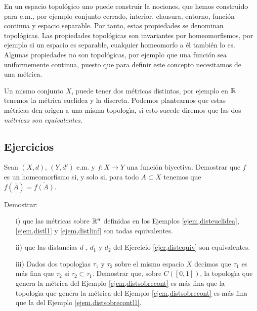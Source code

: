 En un espacio topológico uno puede construir la nociones, que
hemos construido para e.m., por ejemplo conjunto cerrado,
interior, clausura,  entorno, función continua y espacio
separable. Por tanto, estas propiedades se denominan
topológicas. Las propiedades topológicas son invariantes por
homeomorfismos, por ejemplo si un espacio es separable, cualquier
homeomorfo a él también lo es. Algunas propiedades no son
topológicas, por ejemplo que una función sea uniformemente
continua, puesto que para definir este concepto necesitamos de una
métrica.

Un mismo conjunto $X$, puede tener dos métricas distintas, por
ejemplo en $\mathbb{R}$ tenemos la métrica euclidea y la discreta.
Podemos plantearnos que estas métricas den origen a una misma
topolog\'{\i}a, si esto sucede diremos que las dos
\emph{métricas son equivalentes}.


\subsection{Ejercicios}


\begin{ejercicio}{} Sean $(X,d)$, $(Y,d')$ e.m. y $f:X\rightarrow Y$
 una función biyectiva. Demostrar que $f$ es un homeomorfismo
 si, y solo si, para todo $A\subset X$ tenemos que
 $f(\overline{A})=\overline{f(A)}$.
 \end{ejercicio}

 \begin{ejercicio}{} Demostrar:
 \begin{itemize}
    \item[i)] que las métricas sobre $\mathbb{R}^n$
    definidas en los Ejemplos \vref{ejem,disteuclidea},
    \vref{ejem,distl1} y \vref{ejem,distlinf} son todas equivalentes.
    \item[ii)] que las distancias $d$ , $d_1$ y $d_2$ del Ejercicio
    \vref{ejer,distequiv} son equivalentes.
    \item[iii)] Dados dos topolog\'{\i}as $\tau_1$ y $\tau_2$
    sobre el mismo espacio $X$ decimos que $\tau_1$ es más fina
    que $\tau_2$ si $\tau_2\subset \tau_1$. Demostrar que, sobre $C([0,1])$,
    la topolog\'{\i}a que genera la métrica del
    Ejemplo \vref{ejem,distsobrecont} es más fina que la
    topolog\'{\i}a que genera la métrica del Ejemplo
    \vref{ejem,distsobrecont} es más fina que la del
    Ejemplo \vref{ejem,distsobrecontl1}.
 \end{itemize}
 \end{ejercicio}
 
